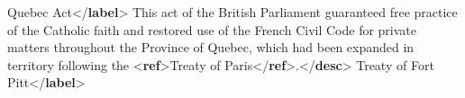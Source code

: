 \begin{shaded}
\hspace*{1em}\mbox{}\newline 
\hspace*{1em}\hspace*{1em}Quebec Act{</\textbf{label}>}\mbox{}\newline 
\hspace*{1em}\hspace*{1em}This act of the British Parliament guaranteed free practice of the Catholic faith and restored use of the\mbox{}\newline 
\hspace*{1em}\hspace*{1em}\hspace*{1em}\hspace*{1em}\hspace*{1em}\hspace*{1em} French Civil Code for private matters throughout the Province of Quebec, which had been expanded in territory\mbox{}\newline 
\hspace*{1em}\hspace*{1em}\hspace*{1em}\hspace*{1em}\hspace*{1em}\hspace*{1em} following the {<\textbf{ref}>}Treaty of Paris{</\textbf{ref}>}.{</\textbf{desc}>}\mbox{}\newline 
\hspace*{1em}\mbox{}\newline 
\hspace*{1em}\mbox{}\newline 
\hspace*{1em}\hspace*{1em}Treaty of Fort Pitt{</\textbf{label}>}\mbox{}\newline 

\end{shaded}
